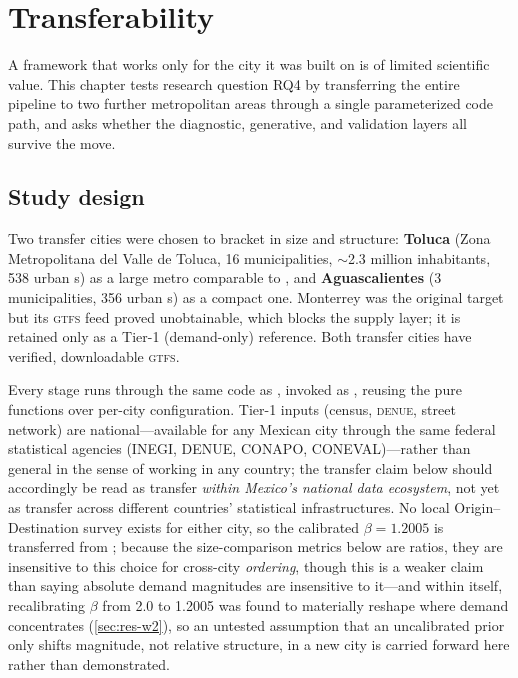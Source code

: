 \chapter{Transferability}
\label{ch:transferability}

A framework that works only for the city it was built on is of limited scientific
value. This chapter tests research question RQ4 by transferring the entire pipeline
to two further metropolitan areas through a single parameterized code path, and
asks whether the diagnostic, generative, and validation layers all survive the move.

\section{Study design}
\label{sec:transf-design}

Two transfer cities were chosen to bracket \zmg in size and structure:
\textbf{Toluca} (Zona Metropolitana del Valle de Toluca, \num{16} municipalities,
$\sim$\num{2.3} million inhabitants, \num{538} urban \ageb{}s) as a large metro
comparable to \zmg, and \textbf{Aguascalientes} (\num{3} municipalities, \num{356}
urban \ageb{}s) as a compact one. Monterrey was the original target but its
\textsc{gtfs} feed proved unobtainable, which blocks the supply layer; it is retained
only as a Tier-1 (demand-only) reference. Both transfer cities have verified,
downloadable \textsc{gtfs}.

Every stage runs through the same code as \zmg, invoked as
, reusing the pure \zmg functions over
per-city configuration. Tier-1 inputs (census, \textsc{denue}, street network) are
national---available for any Mexican city through the same federal statistical
agencies (INEGI, DENUE, CONAPO, CONEVAL)---rather than general in the sense of
working in any country; the transfer claim below should accordingly be read as
transfer \emph{within Mexico's national data ecosystem}, not yet as transfer across
different countries' statistical infrastructures. No local Origin--Destination
survey exists for either city, so the calibrated $\beta = \num{1.2005}$ is
transferred from \zmg; because the size-comparison metrics below are ratios, they
are insensitive to this choice for cross-city \emph{ordering}, though this is a
weaker claim than saying absolute demand magnitudes are insensitive to it---and
within \zmg itself, recalibrating $\beta$ from \num{2.0} to \num{1.2005} was found to
materially reshape where demand concentrates (\cref{sec:res-w2}), so an untested
assumption that an uncalibrated prior only shifts magnitude, not relative structure,
in a new city is carried forward here rather than demonstrated.

